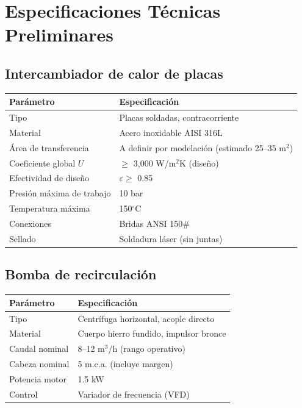 \documentclass[11pt,a4paper]{article}
\begin{document}
\newpage

\section{Especificaciones Técnicas Preliminares}

\subsection{Intercambiador de calor de placas}
\begin{table}[H]
\centering
\begin{tabular}{@{}ll@{}}
\toprule
\textbf{Parámetro} & \textbf{Especificación} \\
\midrule
Tipo & Placas soldadas, contracorriente \\
Material & Acero inoxidable AISI 316L \\
Área de transferencia & A definir por modelación (estimado 25--35 m$^2$) \\
Coeficiente global $U$ & $\geq$ 3,000 W/m$^2$K (diseño) \\
Efectividad de diseño & $\varepsilon \geq$ 0.85 \\
Presión máxima de trabajo & 10 bar \\
Temperatura máxima & 150$^\circ$C \\
Conexiones & Bridas ANSI 150\# \\
Sellado & Soldadura láser (sin juntas) \\
\bottomrule
\end{tabular}
\end{table}

\subsection{Bomba de recirculación}
\begin{table}[H]
\centering
\begin{tabular}{@{}ll@{}}
\toprule
\textbf{Parámetro} & \textbf{Especificación} \\
\midrule
Tipo & Centrífuga horizontal, acople directo \\
Material & Cuerpo hierro fundido, impulsor bronce \\
Caudal nominal & 8--12 m$^3$/h (rango operativo) \\
Cabeza nominal & 5 m.c.a. (incluye margen) \\
Potencia motor & 1.5 kW \\
Control & Variador de frecuencia (VFD) \\
\bottomrule
\end{tabular}
\end{table}
\end{document}
